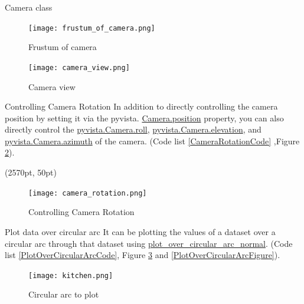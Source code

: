 \documentclass[final]{beamer}
\begin{document}
\begin{frame}[fragile]
\begin{textblock*}{800pt}
\begin{block}{Camera class}

\begin{figure}
\texttt{[image: frustum\_of\_camera.png]}
\caption{Frustum of camera \label{CameraFrustumFigure}}
\end{figure}

\begin{figure}
\texttt{[image: camera\_view.png]}
\caption{Camera view}
\end{figure}
\end{block}
\begin{block}{Controlling Camera Rotation}
In addition to directly controlling the camera position by setting it via the pyvista.
\href{https://dev.pyvista.org/core/camera.html/#pyvista.Camera.position}{Camera.position}
property, you can also directly control the
\href{https://dev.pyvista.org/core/camera.html/#pyvista.Camera.roll}{pyvista.Camera.roll},
\href{https://dev.pyvista.org/core/camera.html/#pyvista.Camera.elevation}{pyvista.Camera.elevation}, and
\href{https://dev.pyvista.org/core/camera.html/#pyvista.Camera.azimuth}{pyvista.Camera.azimuth}
of the camera.
(Code list \ref{CameraRotationCode} ,Figure \ref{CameraRotationFigure}).



\end{block}
\end{textblock*}
\begin{textblock*}{800pt}(2570pt, 50pt)
\begin{figure}
\texttt{[image: camera\_rotation.png]}
\caption{Controlling Camera Rotation \label{CameraRotationFigure}}
\end{figure}
\begin{block}{Plot data over circular arc}
It can be plotting the values of a dataset over a circular arc through that dataset using
\href{https://dev.pyvista.org/core/filters.html#pyvista.DataSetFilters.plot_over_circular_arc_normal}{plot\_over\_circular\_arc\_normal}.
(Code list \ref{PlotOverCircularArcCode},
Figure \ref{CircularArcToPlotFigure} and \ref{PlotOverCircularArcFigure}).
\begin{figure}
\texttt{[image: kitchen.png]}
\caption{Circular arc to plot \label{CircularArcToPlotFigure}}
\end{figure}

\end{block}
\end{textblock*}
\end{frame}
\end{document}
